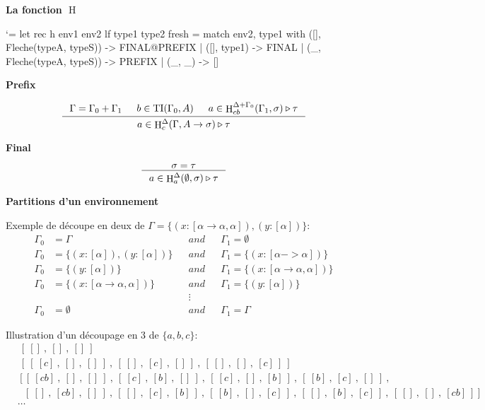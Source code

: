 \documentclass{beamer}
\newcommand\heading[1]{%
  \par\bigskip
  {\Large\bfseries#1}\par\smallskip}
\let\origlstlisting=\lstlisting
\let\endoriglstlisting=\endlstlisting
\renewenvironment{lstlisting}
{\mathcode`\-=\hyphenmathcode
    \everymath{}\mathsurround=0pt\origlstlisting}
{\endoriglstlisting}
\DeclareMathOperator{\iH}{H}
\DeclareMathOperator{\iTI}{TI}
\begin{document}
    
    \begin{frame}[containsverbatim]
        \heading{La fonction $\iH$}
        \begin{lstlisting}
let rec h env1 env2 lf type1 type2 fresh =
  match env2, type1 with
    ([], Fleche(typeA, typeS)) -> FINAL@PREFIX
    | ([], type1) -> FINAL
    | (_, Fleche(typeA, typeS)) -> PREFIX
    | (_, _) -> []
        \end{lstlisting}
        \heading{Prefix}
        \begin{displaymath}
        \inference[]{\Gamma = \Gamma_0 + \Gamma_1 & b \in \iTI(\Gamma_0, A) & a \in \iH^{\Delta + \Gamma_0}_{cb}(\Gamma_1, \sigma) \triangleright \tau}{a \in \iH^{\Delta}_c(\Gamma, A \rightarrow \sigma) \triangleright \tau}
        \end{displaymath}
        
        \heading{Final}
        \begin{displaymath}
        \inference[]{\sigma = \tau}{a \in \iH^{\Delta}_a(\emptyset, \sigma) \triangleright \tau}
        \end{displaymath}
    \end{frame}
    
    \begin{frame}
            \heading{Partitions d'un environnement}
            Exemple de découpe en deux de  $\Gamma = \{(x : [\alpha \rightarrow \alpha, \alpha]), (y : [\alpha])\}$:
            \begin{align*}
               \Gamma_0 &= \Gamma &&and&& \Gamma_1 = \emptyset
               \\\Gamma_0 &= \{(x:[\alpha]), (y:[\alpha])\} &&and&& \Gamma_1 = \{(x:[\alpha -> \alpha])\}
               \\\Gamma_0 &= \{(y:[\alpha])\} &&and&& \Gamma_1 = \{(x : [\alpha \rightarrow \alpha, \alpha])\}
               \\\Gamma_0 &= \{(x : [\alpha \rightarrow \alpha, \alpha])\} &&and&& \Gamma_1 = \{(y:[\alpha])\}
               \\&&&\vdots&&
               \\\Gamma_0 &= \emptyset &&and&& \Gamma_1 = \Gamma
            \end{align*}
            
            Illustration d'un découpage en 3 de $\{a,b,c\}$:
            \begin{align*}
                &\ [\ []\ ,\ []\ ,\ []\ ]\ &
                \\&\ [\ [\ [c]\ ,\ []\ ,\ []\ ]\ ,\ [\ []\ ,\ [c]\ ,\ []\ ]\ ,\ [\ []\ ,\ []\ ,\ [c]\ ]\ ]\ &
                \\&\ [\ [\ [cb]\ ,\ []\ ,\ []\ ]\ ,\ [\ [c]\ ,\ [b]\ ,\ []\ ]\ ,\ [\ [c]\ ,\ []\ ,\ [b]\ ]\ ,
                \ [\ [b]\ ,\ [c]\ ,\ []\ ]\ ,&
                \\&\ \ \ [\ []\ ,\ [cb]\ ,\ []\ ]\ ,\ [\ []\ ,\ [c]\ ,\ [b]\ ]\ ,
                \ [\ [b]\ ,\ []\ ,\ [c]\ ]\ ,\ [\ []\ ,\ [b]\ ,\ [c]\ ]\ ,\ [\ []\ ,\ []\ ,\ [cb]\ ]\  ]&
                \\&\ldots&
            \end{align*}
    \end{frame}
    
\end{document}
